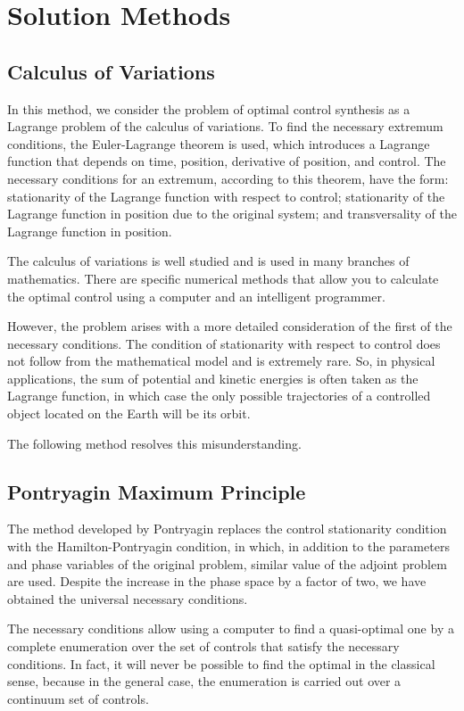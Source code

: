     \section{Solution Methods}
    \subsection{Calculus of Variations}
    In this method, we consider the problem of optimal control synthesis as a Lagrange problem of the calculus of variations.
    To find the necessary extremum conditions, the Euler-Lagrange theorem is used, which introduces a Lagrange function that depends on time, position, derivative of position, and control.
    The necessary conditions for an extremum, according to this theorem, have the form: stationarity of the Lagrange function with respect to control; stationarity of the Lagrange function in position due to the original system; and transversality of the Lagrange function in position.

    The calculus of variations is well studied and is used in many branches of mathematics.
    There are specific numerical methods that allow you to calculate the optimal control using a computer and an intelligent programmer.

    However, the problem arises with a more detailed consideration of the first of the necessary conditions.
    The condition of stationarity with respect to control does not follow from the mathematical model and is extremely rare.
    So, in physical applications, the sum of potential and kinetic energies is often taken as the Lagrange function, in which case the only possible trajectories of a controlled object located on the Earth will be its orbit.

    The following method resolves this misunderstanding.

    \subsection{Pontryagin Maximum Principle}
    The method developed by Pontryagin replaces the control stationarity condition with the Hamilton-Pontryagin condition, in which, in addition to the parameters and phase variables of the original problem, similar value of the adjoint problem are used.
    Despite the increase in the phase space by a factor of two, we have obtained the universal necessary conditions.

    The necessary conditions allow using a computer to find a quasi-optimal one by a complete enumeration over the set of controls that satisfy the necessary conditions.
    In fact, it will never be possible to find the optimal in the classical sense, because in the general case, the enumeration is carried out over a continuum set of controls.

